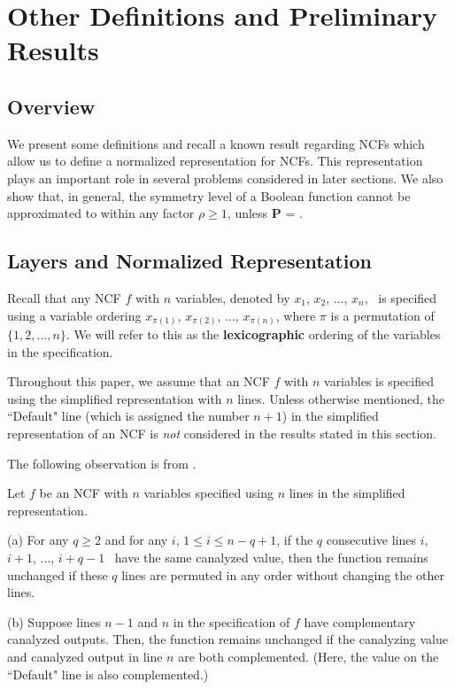 \section{Other Definitions and Preliminary Results}
\label{sec:prelim}

\subsection{Overview}

We present some definitions and recall
a known result regarding NCFs which allow us
to define a normalized representation for NCFs.
This representation plays an important role in several
problems considered in later sections.
We also show that, in general, the symmetry level
of a Boolean function cannot be approximated to within any
factor $\rho \geq 1$, unless \textbf{P} = \cnp.

\medskip

\subsection{Layers and Normalized Representation}
\label{sse:ncf_layer}

Recall that any NCF $f$ with $n$ variables,
denoted by $x_1$, $x_2$, $\ldots$, $x_n$,~
is specified using a variable ordering 
$x_{\pi(1)}$, $x_{\pi(2)}$, $\ldots$,  $x_{\pi(n)}$,
where $\pi$ is a permutation of $\{1, 2, \ldots, n\}$.
We will refer to this as the \textbf{lexicographic} ordering
of the variables in the specification.

\medskip

Throughout this paper, we assume that an NCF $f$ with $n$
variables is specified using the simplified representation with $n$ lines. 
Unless otherwise mentioned, the ``Default" line (which is assigned the number $n+1$)
in the simplified representation of an NCF is \emph{not} considered
in the results stated in this section.

The following observation is from \cite{Stearns-etal-2018}.

\begin{observation} \label{obs:ncf_transformations}
Let $f$ be an NCF with $n$ variables specified using $n$ lines
in the simplified representation. 
\begin{description}
\item{(a)} 
For any $q \geq 2$ and for any $i$, $1 \leq i \leq n-q+1$,
if the $q$ consecutive lines $i$, $i+1$, $\ldots$, $i+q-1$~
have the same canalyzed value, then the function remains
unchanged if these $q$ lines are permuted in any order
without changing the other lines.

\item{(b)} 
Suppose lines $n-1$ and $n$ in the specification of $f$ 
have complementary canalyzed outputs.
Then, the function remains unchanged 
if the canalyzing value and canalyzed output in line $n$
are both complemented. 
(Here, the value on the ``Default" line is also complemented.)
\QED
\end{description}
\end{observation}

